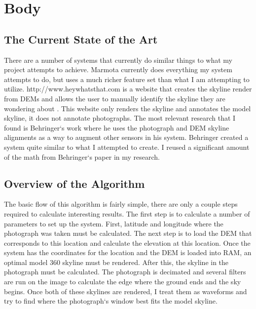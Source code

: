 \documentclass{acm_proc_article-sp}
\begin{document}
\section{Body}
\subsection{The Current State of the Art}
There are a number of systems that currently do similar things to what my project attempts to achieve.  Marmota currently does everything my system attempts to do, but uses a much richer feature set than what I am attempting to utilize.\cite{chippendale2009environmental, chippendale2009spatial} http://www.heywhatsthat.com is a website that creates the skyline render from DEMs and allows the user to manually identify the skyline they are wondering about \cite{wong2008we, heywhatsthat}.  This website only renders the skyline and annotates the model skyline, it does not annotate photographs.  The most relevant research that I found is Behringer`s work \cite{behringer2002registration} where he uses the photograph and DEM skyline alignments as a way to augment other sensors in his system.  Behringer created a system quite similar to what I attempted to create. I reused a significant amount of the math from Behringer`s paper in my research.

\subsection{Overview of the Algorithm}
	The basic flow of this algorithm is fairly simple, there are only a couple steps required to calculate interesting results.  The first step is to calculate a number of parameters to set up the system.  First, latitude and longitude where the photograph was taken must be calculated.  The next step is to load the DEM that corresponds to this location and calculate the elevation at this location.  Once the system has the coordinates for the location and the DEM is loaded into RAM, an optimal model 360 skyline must be rendered. 
	After this, the skyline in the photograph must be calculated.  The photograph is decimated and several filters are run on the image to calculate the edge where the ground ends and the sky begins. Once both of these skylines are rendered, I treat them as waveforms \cite{Schafer:DSP} and try to find where the photograph`s window best fits the model skyline. 
\end{document}
